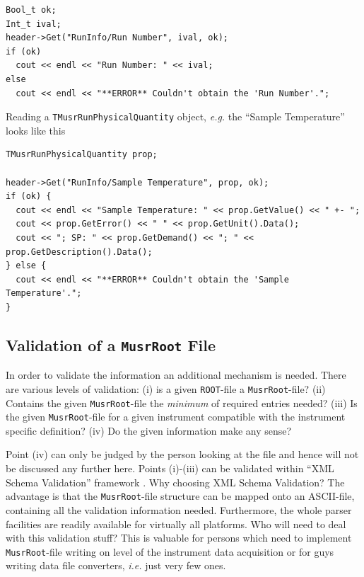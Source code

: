\documentclass[twoside]{article}
\newcommand{\musrroot}{\texttt{MusrRoot}\xspace}
\newcommand{\rootcern}{\texttt{ROOT}\xspace}
\newcommand{\ie}{\emph{i.e.}\xspace}
\newcommand{\eg}{\emph{e.g.}\xspace}
\newcommand{\tquant}{\texttt{TMusrRunPhysicalQuantity}\xspace}
\begin{document}
\begin{shaded}
\begin{verbatim}
Bool_t ok;
Int_t ival;  
header->Get("RunInfo/Run Number", ival, ok);
if (ok)
  cout << endl << "Run Number: " << ival;
else
  cout << endl << "**ERROR** Couldn't obtain the 'Run Number'.";
\end{verbatim}
\end{shaded}
 
\noindent Reading a \tquant object, \eg the ``Sample Temperature'' looks like this 

\begin{shaded}
\begin{verbatim}
TMusrRunPhysicalQuantity prop;

header->Get("RunInfo/Sample Temperature", prop, ok);
if (ok) {
  cout << endl << "Sample Temperature: " << prop.GetValue() << " +- ";
  cout << prop.GetError() << " " << prop.GetUnit().Data();
  cout << "; SP: " << prop.GetDemand() << "; " << prop.GetDescription().Data();
} else {
  cout << endl << "**ERROR** Couldn't obtain the 'Sample Temperature'.";
}
\end{verbatim}
\end{shaded}


\subsection{Validation of a \musrroot File}\label{sec:Validation}

In order to validate the information an additional mechanism is needed. There are various levels of validation: (i) is a given \rootcern-file a \musrroot-file? (ii) Contains the given \musrroot-file the \emph{minimum} of required entries needed? (iii) Is the given \musrroot-file for a given instrument compatible with the instrument specific definition? (iv) Do the given information make any sense?  

Point (iv) can only be judged by the person looking at the file and hence will not be discussed any further here. Points (i)-(iii) can be validated within ``XML Schema Validation'' framework \cite{xml-schema}. Why choosing XML Schema Validation? The advantage is that the \musrroot-file structure can be mapped onto an ASCII-file, containing all the validation information needed. Furthermore, the whole parser facilities are readily available for virtually all platforms. Who will need to deal with this validation stuff? This is valuable for persons which need to implement \musrroot-file writing on level of the instrument data acquisition or for guys writing data file converters, \ie just very few ones. 
\end{document}

